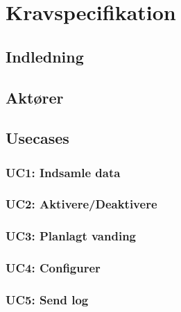 \chapter{Kravspecifikation}

\clearpage


\section{Indledning}



\section{Aktører}



\section{Usecases}


\subsection{UC1: Indsamle data}



\subsection{UC2: Aktivere/Deaktivere}



\subsection{UC3: Planlagt vanding}



\subsection{UC4: Configurer}



\subsection{UC5: Send log}


